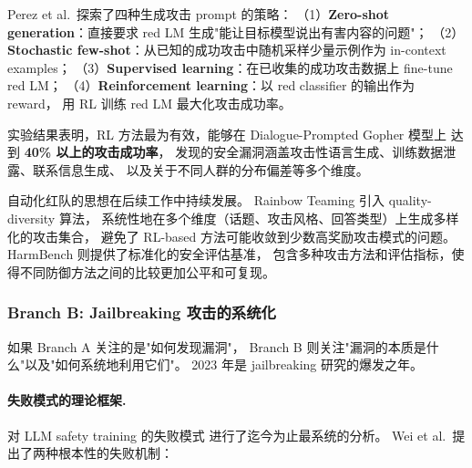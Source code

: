\noindent
Perez et al.\ 探索了四种生成攻击 prompt 的策略：
（1）\textbf{Zero-shot generation}：直接要求 red LM 生成"能让目标模型说出有害内容的问题"；
（2）\textbf{Stochastic few-shot}：从已知的成功攻击中随机采样少量示例作为 in-context examples；
（3）\textbf{Supervised learning}：在已收集的成功攻击数据上 fine-tune red LM；
（4）\textbf{Reinforcement learning}：以 red classifier 的输出作为 reward，
用 RL 训练 red LM 最大化攻击成功率。

实验结果表明，RL 方法最为有效，能够在 Dialogue-Prompted Gopher 模型上
达到 \textbf{40\% 以上的攻击成功率}，
发现的安全漏洞涵盖攻击性语言生成、训练数据泄露、联系信息生成、
以及关于不同人群的分布偏差等多个维度。

\noindent
自动化红队的思想在后续工作中持续发展。
Rainbow Teaming \cite{samvelyan2024rainbow} 引入 quality-diversity 算法，
系统性地在多个维度（话题、攻击风格、回答类型）上生成多样化的攻击集合，
避免了 RL-based 方法可能收敛到少数高奖励攻击模式的问题。
HarmBench \cite{mazeika2024harmbench} 则提供了标准化的安全评估基准，
包含多种攻击方法和评估指标，使得不同防御方法之间的比较更加公平和可复现。

\subsubsection{Branch B: Jailbreaking 攻击的系统化}
\label{sec:t3-jailbreak}

如果 Branch A 关注的是"如何发现漏洞"，
Branch B 则关注"漏洞的本质是什么"以及"如何系统地利用它们"。
2023 年是 jailbreaking 研究的爆发之年。

\paragraph{失败模式的理论框架.}
 对 LLM safety training 的失败模式
进行了迄今为止最系统的分析。
Wei et al.\ 提出了两种根本性的失败机制：

